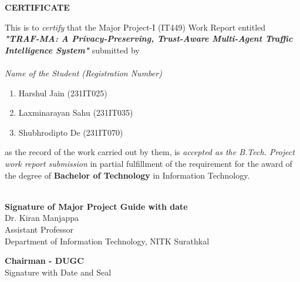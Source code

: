 \begin{framed}
	\begin{center}
		\textbf{{\Large CERTIFICATE}}
	\end{center}
	\null
	This is to \textit{certify} that the Major Project-I (IT449) Work Report entitled \textit{\textbf{"TRAF-MA: A Privacy-Preserving, Trust-Aware Multi-Agent Traffic Intelligence System"}} submitted by \\
	\\
	\textit{Name of the Student (Registration Number)}
	\begin{enumerate}[label={(\arabic*)}]
		\item  Harshul Jain (231IT025)
		\item  Laxminarayan Sahu (231IT035)
		\item  Shubhrodipto De (231IT070)
	\end{enumerate}
	as the record of the work carried out by them, is \textit{accepted as the B.Tech. Project work report submission} in partial fulfillment of the requirement for the award of the degree of \textbf {Bachelor of Technology} in Information Technology.
	\\
    \\
	\begin{minipage}{14cm}
		\begin{center}                                      	\vspace{1.5cm}	
			\textbf{Signature of Major Project Guide with date}
            \\Dr. Kiran Manjappa
            \\Assistant Professor \\
			Department of Information Technology, NITK Surathkal \\
			\end{center}       
     \vspace{0.75cm}
        \begin{center}                                      	\vspace{1.5cm}	
			\textbf{Chairman - DUGC}
            \\{Signature with Date and Seal}
          	\end{center} 
	\end{minipage}
\\
\\
\\

\end{framed}
\thispagestyle{empty}
\clearpage
